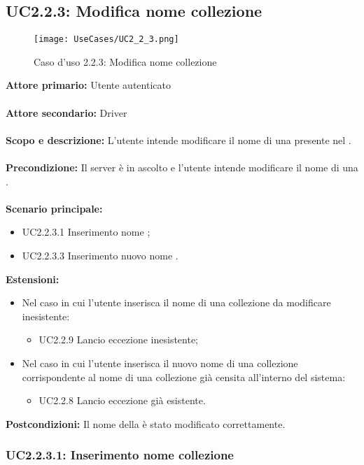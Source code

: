 \documentclass{scalatekids-article}
\begin{document}
\subsection{UC2.2.3: Modifica nome collezione}
\begin{figure}[H]
  \begin{center}
    \texttt{[image: UseCases/UC2\_2\_3.png]}
    \caption*{Caso d'uso 2.2.3: Modifica nome collezione}
  \end{center}
\end{figure}
\textbf{Attore primario:} Utente autenticato\\ \\
\textbf{Attore secondario:} Driver\\ \\
\textbf{Scopo e descrizione:} L’utente intende modificare il nome di una  presente nel .\\ \\
\textbf{Precondizione:} Il server è in ascolto e l’utente intende modificare il nome di una .\\ \\
\textbf{Scenario principale:}
\begin{itemize}
\item UC2.2.3.1 Inserimento nome ;
\item UC2.2.3.3 Inserimento nuovo nome .
\end{itemize}
\textbf{Estensioni:}
\begin{itemize}
\item Nel caso in cui l'utente inserisca il nome di una collezione da modificare inesistente:
  \begin{itemize}
  \item UC2.2.9 Lancio eccezione  inesistente;
  \end{itemize}
\item Nel caso in cui l'utente inserisca il nuovo nome di una collezione corrispondente al nome di una collezione già censita all'interno del sistema:
  \begin{itemize}
  \item UC2.2.8 Lancio eccezione  già esistente.
  \end{itemize}
\end{itemize}
\textbf{Postcondizioni:} Il nome della  è stato modificato correttamente.

\subsubsection{UC2.2.3.1: Inserimento nome collezione}
\end{document}
